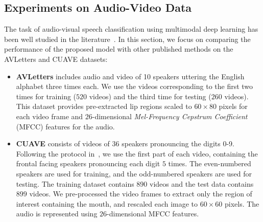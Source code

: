 \documentclass[10pt,twocolumn,letterpaper]{article}
\begin{document}
\subsection{Experiments on Audio-Video Data}
\label{sec:exp2}
The task of audio-visual speech classification using multimodal deep learning has been well studied in the literature~\cite{hu2016temporal,ngiam2011multimodal}. In this section, we focus on comparing the performance of the proposed model with other published methods on the AVLetters and CUAVE datasets:
\begin{itemize}
\item \textbf{AVLetters} \cite{matthews2002extraction} includes audio and video of 10 speakers uttering the English alphabet three times each. We use the videos corresponding to the first two times for training ($520$ videos) and the third time for testing ($260$ videos). This dataset provides pre-extracted lip regions scaled to $60 \times 80$ pixels for each video frame and $26$-dimensional \textit{Mel-Frequency Cepstrum Coefficient} (MFCC) features for the audio.

\item \textbf{CUAVE} \cite{patterson2002cuave} consists of videos of $36$ speakers pronouncing the digits 0-9. Following the protocol in~\cite{ngiam2011multimodal}, we use the first part of each video, containing the frontal facing speakers pronouncing each digit $5$ times. The even-numbered speakers are used for training, and the odd-numbered speakers are used for testing. The training dataset contains $890$ videos and the test data contains $899$ videos. We pre-processed the video frames to extract only the region of interest containing the mouth, and rescaled each image to $60 \times 60$ pixels. The audio is represented using $26$-dimensional MFCC features.

\end{itemize}
\end{document}
